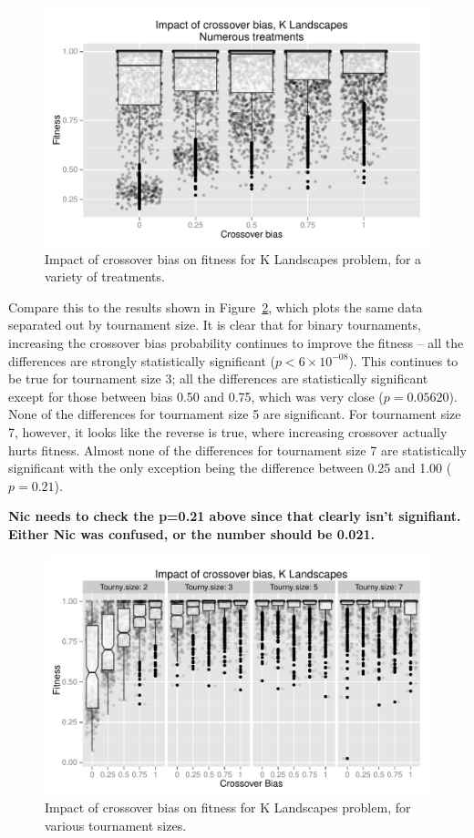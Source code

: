 \documentclass{sig-alternate}
\begin{document}
%
%
%
%

\begin{figure}
\centering
\includegraphics[width=0.45 \textwidth]{Plots/KLandscapes6_XO_bias_impact_transformed_boxplot_alpha075.pdf}
\caption{Impact of crossover bias on fitness for K Landscapes problem, for a variety of treatments.}
\label{fig:KLandscapes6_results}
\end{figure}

Compare this to the results shown in Figure~\ref{fig:KLandscapes6_XO_bias_impact_facets}, which plots the same data
separated out by tournament size. It is clear that for binary tournaments, increasing the crossover bias probability
continues to improve the fitness -- all the differences are strongly statistically significant ($p<6\times 10^{-08}$).
This continues to be true for tournament size 3; all the differences are statistically significant except for those
between bias 0.50 and 0.75, which was very close ($p=0.05620$). None of the differences for tournament size 5 are
significant. For tournament size 7, however, it looks like the reverse is true, where increasing crossover actually
hurts fitness. Almost none of the differences for tournament size 7 are statistically significant with the only
exception being the difference between 0.25 and 1.00 ($p=0.21$).

\textbf{Nic needs to check the p=0.21 above since that clearly isn't signifiant. Either Nic was confused, or the number
should be 0.021.}

\begin{figure}
\centering
\includegraphics[width=0.45 \textwidth]{Plots/KLandscapes6_XO_bias_impact_facets.pdf}
\caption{Impact of crossover bias on fitness for K Landscapes problem, for various tournament sizes.}
\label{fig:KLandscapes6_XO_bias_impact_facets}
\end{figure}
\end{document}
